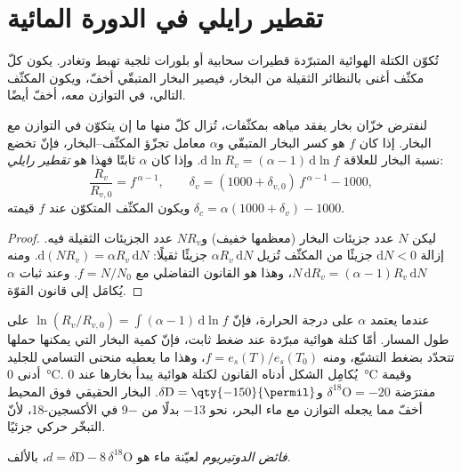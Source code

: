 \section{تقطير رايلي في الدورة المائية}\label{sec:b3:stable-isotopes:rayleigh}

تُكوّن الكتلة الهوائية المتبرّدة قطيرات سحابية أو بلورات ثلجية تهبط
وتغادر. يكون كلّ مكثّف أغنى بالنظائر الثقيلة من البخار، فيصير
البخار المتبقّي أخفّ، ويكون المكثّف التالي، في التوازن معه، أخفّ
أيضًا.

\begin{proposition}\label{prop:b3:stable-isotopes:rayleigh-distillation}
لنفترض خزّان بخار يفقد مياهه بمكثّفات، تُزال كلّ منها ما إن
يتكوّن في التوازن مع البخار. إذا كان $f$ هو كسر البخار المتبقّي
و$\alpha$ معامل تجزّؤ المكثّف--البخار، فإنّ
تخضع نسبة البخار للعلاقة $\mathrm d\ln R_v = (\alpha - 1)\,\mathrm d\ln f$. وإذا
كان $\alpha$ ثابتًا فهذا هو \emph{تقطير
رايلي}:
\[
\frac{R_v}{R_{v,0}} = f^{\,\alpha - 1}, \qquad
\delta_v = (1000 + \delta_{v,0})\,f^{\,\alpha - 1} - 1000,
\]
ويكون المكثّف المتكوّن عند $f$ قيمته $\delta_c = \alpha(1000 + \delta_v) - 1000$.
\end{proposition}

\begin{proof}
ليكن $N$ عدد جزيئات البخار (معظمها خفيف) و$N R_v$
عدد الجزيئات الثقيلة فيه. إزالة $\mathrm dN < 0$ جزيئًا من المكثّف
تُزيل $\alpha R_v\,\mathrm dN$ جزيئًا ثقيلًا: $\mathrm d(NR_v) = \alpha
R_v\,\mathrm dN$. ومنه $N\,\mathrm dR_v = (\alpha - 1)R_v\,\mathrm dN$، وهذا هو
القانون التفاضلي مع $f = N/N_0$. وعند ثبات $\alpha$ يُكامَل إلى
قانون القوّة.
\end{proof}

عندما يعتمد $\alpha$ على درجة الحرارة، فإنّ $\ln(R_v/R_{v,0}) = \int(\alpha - 1)\,
\mathrm d\ln f$ على طول المسار. أمّا كتلة هوائية مبرّدة عند ضغط ثابت،
فإنّ كمية البخار التي يمكنها حملها تتحدّد بضغط التشبّع، ومنه $f =
e_s(T)/e_s(T_0)$، وهذا ما يعطيه منحنى التسامي للجليد أدنى
\qty{0}{\celsius}. يُكامِل الشكل أدناه القانون لكتلة هوائية يبدأ بخارها عند
\qty{0}{\celsius} وقيمة مفترَضة $\delta^{18}\mathrm O = -20$
و$\delta\mathrm D = \qty{-150}{\permil}$. البخار الحقيقي فوق المحيط أخفّ
مما يجعله التوازن مع ماء البحر، نحو $-13$ بدلًا من
\qty{-9}{\permil} في الأكسجين-18، لأنّ التبخّر حركي جزئيًا.

\begin{definition}\label{def:b3:stable-isotopes:d-excess}
\emph{فائض الدوتيريوم} لعيّنة ماء هو $d =
\delta\mathrm D - 8\,\delta^{18}\mathrm O$، بالألف.
\end{definition}

